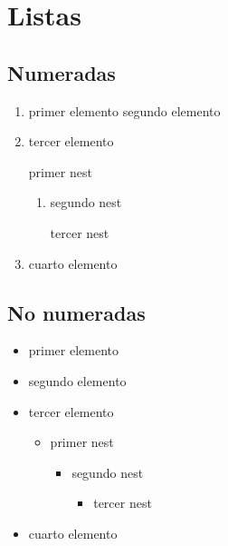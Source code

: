 \documentclass[theorems,spanish,code]{HomeWork}
\begin{document}
\section{Listas}
\begin{minipage}{0.5\textwidth}
\subsection{Numeradas}
\begin{enumerate}
    \item primer elemento
    \staritem segundo elemento
    \item tercer elemento
    \begin{enumerate}
        \staritem primer nest
        \begin{enumerate}
            \item segundo nest
            \begin{enumerate}
                \staritem tercer nest
            \end{enumerate}
        \end{enumerate}
    \end{enumerate}
    \item cuarto elemento
\end{enumerate}

\subsection{No numeradas}
\begin{itemize}
    \item primer elemento
    \item segundo elemento
    \item tercer elemento
    \begin{itemize}
        \item primer nest
        \begin{itemize}
            \item segundo nest
            \begin{itemize}
                \item tercer nest
            \end{itemize}
        \end{itemize}
    \end{itemize}
    \item cuarto elemento
\end{itemize}
\end{minipage}
\end{document}
